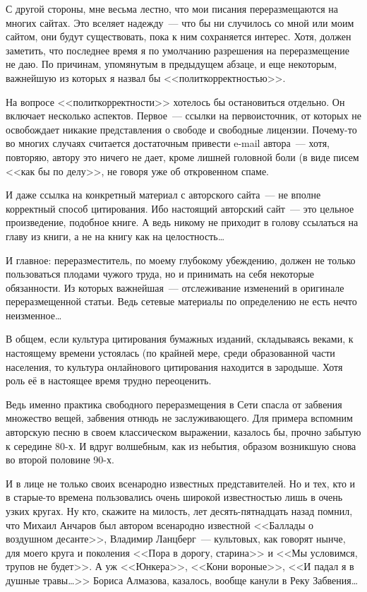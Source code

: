С другой стороны, мне весьма лестно, что мои писания переразмещаются на многих сайтах. Это вселяет надежду~--- что бы ни случилось со мной или моим сайтом, они будут существовать, пока к ним сохраняется интерес. Хотя, должен заметить, что последнее время я по умолчанию разрешения на переразмещение не даю. По причинам, упомянутым в предыдущем абзаце, и еще некоторым, важнейшую из которых я назвал бы <<политкорректностью>>.

На вопросе <<политкорректности>> хотелось бы остановиться отдельно. Он включает несколько аспектов. Первое~--- ссылки на первоисточник, от которых не освобождает никакие представления о свободе и свободные лицензии. Почему-то во многих случаях считается достаточным привести e-mail автора~--- хотя, повторяю, автору это ничего не дает, кроме лишней головной боли (в виде писем <<как бы по делу>>, не говоря уже об откровенном спаме. 

И даже ссылка на конкретный материал с авторского сайта~--- не вполне корректный способ цитирования. Ибо настоящий авторский сайт~--- это цельное произведение, подобное книге. А ведь никому не приходит в голову ссылаться на главу из книги, а не на книгу как на целостность\dots 

И главное: переразместитель, по моему глубокому убеждению, должен не только пользоваться плодами чужого труда, но и принимать на себя некоторые обязанности. Из которых важнейшая~--- отслеживание изменений в оригинале переразмещенной статьи. Ведь сетевые материалы по определению не есть нечто неизменное\dots 

В общем, если культура цитирования бумажных изданий, складываясь веками, к настоящему времени устоялась (по крайней мере, среди образованной части населения, то культура онлайнового цитирования находится в зародыше. Хотя роль её в настоящее время трудно переоценить. 

Ведь именно практика свободного переразмещения в Сети спасла от забвения множество вещей, забвения отнюдь не заслуживающего. Для примера вспомним авторскую песню в своем классическом выражении, казалось бы, прочно забытую к середине 80-х. И вдруг волшебным, как из небытия, образом возникшую снова во второй половине 90-х. 

И в лице не только своих всенародно известных представителей. Но и тех, кто и в старые-то времена пользовались очень широкой известностью лишь в очень узких кругах. Ну кто, скажите на милость, лет десять-пятнадцать назад помнил, что Михаил Анчаров был автором всенародно известной <<Баллады о воздушном десанте>>, Владимир Ланцберг~--- культовых, как говорят нынче, для моего круга и поколения <<Пора в дорогу, старина>> и <<Мы условимся, трупов не будет>>. А уж <<Юнкера>>, <<Кони вороные>>, <<И падал я в душные травы\dots>> Бориса Алмазова, казалось, вообще канули в Реку Забвения\dots 

